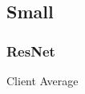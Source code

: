\documentclass[letterpaper]{article}
\begin{document}
\subsection{Small}

\subsubsection{ResNet}

Client Average


\end{document}
